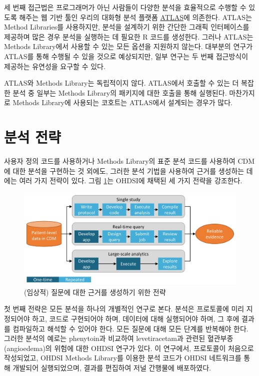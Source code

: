 \documentclass[11pt]{book}
\theoremstyle{definition}
\theoremstyle{definition}
\theoremstyle{definition}
\theoremstyle{remark}
\begin{document}
세 번째 접근법은 프로그래머가 아닌 사람들이 다양한 분석을 효율적으로
수행할 수 있도록 해주는 웹 기반 툴인 우리의 대화형 분석 플랫폼
\href{https://github.com/OHDSI/Atlas/wiki}{ATLAS}에 의존한다. ATLAS는
Method Libraries를 사용하지만, 분석을 설계하기 위한 간단한 그래픽
인터페이스를 제공하며 많은 경우 분석을 실행하는 데 필요한 R 코드를
생성한다. 그러나 ATLAS는 Methods Library에서 사용할 수 있는 모든 옵션을
지원하지 않는다. 대부분의 연구가 ATLAS를 통해 수행될 수 있을 것으로
예상되지만, 일부 연구는 두 번째 접근방식이 제공하는 유연성을 요구할 수
있다.

ATLAS와 Methods Library는 독립적이지 않다. ATLAS에서 호출할 수 있는 더
복잡한 분석 중 일부는 Methods Library의 패키지에 대한 호출을 통해
실행된다. 마찬가지로 Methods Library에 사용되는 코호트는 ATLAS에서
설계되는 경우가 많다.

\section{분석 전략}\label{-}

사용자 정의 코드를 사용하거나 Methods Library의 표준 분석 코드를
사용하여 CDM에 대한 분석을 구현하는 것 외에도, 그러한 분석 기법을
사용하여 근거를 생성하는 데에는 여러 가지 전략이 있다. 그림
\ref{fig:strategies}는 OHDSI에 채택된 세 가지 전략을 강조한다.

\begin{figure}

{\centering \includegraphics[width=0.9\linewidth]{images/OhdsiAnalyticsTools/strategies} 

}

\caption{(임상적) 질문에 대한 근거를 생성하기 위한 전략}\label{fig:strategies}
\end{figure}

첫 번째 전략은 모든 분석을 하나의 개별적인 연구로 본다. 분석은
프로토콜에 미리 지정되어야 하고, 코드로 구현되어야 하며, 데이터에 대해
실행되어야 하며, 그 후에 결과를 컴파일하고 해석할 수 있어야 한다. 모든
질문에 대해 모든 단계를 반복해야 한다. 그러한 분석의 예로는 phenytoin과
비교하여 levetiracetam과 관련된 혈관부종(angioedema)의 위험에 대한 OHDSI
연구가 있다. \citep{duke_2017} 이 연구에서, 프로토콜이 처음으로
작성되었고, OHDSI Methods Library를 이용한 분석 코드가 OHDSI 네트워크를
통해 개발되어 실행되었으며, 결과를 편집하여 저널 간행물에 배포하였다.
\end{document}
